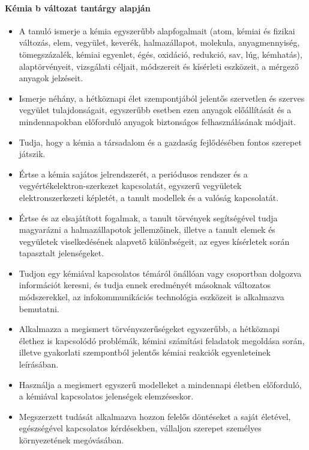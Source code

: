 \paragraph{Kémia
		b változat tantárgy alapján}
\begin{itemize}
\item A tanuló ismerje a kémia egyszerűbb alapfogalmait (atom, kémiai és fizikai változás, elem, vegyület, keverék, halmazállapot, molekula, anyagmennyiség, tömegszázalék, kémiai egyenlet, égés, oxidáció, redukció, sav, lúg, kémhatás), alaptörvényeit, vizsgálati céljait, módszereit és kísérleti eszközeit, a mérgező anyagok jelzéseit.
\item Ismerje néhány, a hétköznapi élet szempontjából jelentős szervetlen és szerves vegyület tulajdonságait, egyszerűbb esetben ezen anyagok előállítását és a mindennapokban előforduló anyagok biztonságos felhasználásának módjait.
\item Tudja, hogy a kémia a társadalom és a gazdaság fejlődésében fontos szerepet játszik.
\item Értse a kémia sajátos jelrendszerét, a periódusos rendszer és a vegyértékelektron-szerkezet kapcsolatát, egyszerű vegyületek elektronszerkezeti képletét, a tanult modellek és a valóság kapcsolatát.
\item Értse és az elsajátított fogalmak, a tanult törvények segítségével tudja magyarázni a halmazállapotok jellemzőinek, illetve a tanult elemek és vegyületek viselkedésének alapvető különbségeit, az egyes kísérletek során tapasztalt jelenségeket.
\item Tudjon egy kémiával kapcsolatos témáról önállóan vagy csoportban dolgozva információt keresni, és tudja ennek eredményét másoknak változatos módszerekkel, az infokommunikációs technológia eszközeit is alkalmazva bemutatni.
\item Alkalmazza a megismert törvényszerűségeket egyszerűbb, a hétköznapi élethez is kapcsolódó problémák, kémiai számítási feladatok megoldása során, illetve gyakorlati szempontból jelentős kémiai reakciók egyenleteinek leírásában.
\item Használja a megismert egyszerű modelleket a mindennapi életben előforduló, a kémiával kapcsolatos jelenségek elemzéseskor.
\item Megszerzett tudását alkalmazva hozzon felelős döntéseket a saját életével, egészségével kapcsolatos kérdésekben, vállaljon szerepet személyes környezetének megóvásában.
\end{itemize}
